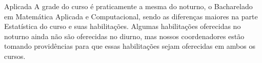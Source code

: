 \begin{subsecao}{Aplicada}
A grade do curso é praticamente a mesma do noturno, o Bacharelado em Matemática
Aplicada e Computacional, sendo as diferenças maiores na parte Estatística do
curso e suas habilitações. Algumas habilitações oferecidas no noturno ainda não
são oferecidas no diurno, mas nossos coordenadores estão tomando providências
para que essas habilitações sejam oferecidas em ambos os cursos.

\end{subsecao}
